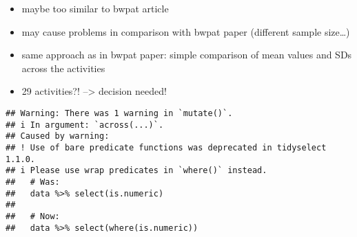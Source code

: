 \documentclass[
]{article}
\providecommand{\tightlist}{%
  \setlength{\itemsep}{0pt}\setlength{\parskip}{0pt}}
\begin{document}
\begin{itemize}
\tightlist
\item
  maybe too similar to bwpat article
\item
  may cause problems in comparison with bwpat paper (different sample
  size\ldots)
\item
  same approach as in bwpat paper: simple comparison of mean values and
  SDs across the activities
\item
  29 activities?! --\textgreater{} decision needed!
\end{itemize}

\begin{verbatim}
## Warning: There was 1 warning in `mutate()`.
## i In argument: `across(...)`.
## Caused by warning:
## ! Use of bare predicate functions was deprecated in tidyselect 1.1.0.
## i Please use wrap predicates in `where()` instead.
##   # Was:
##   data %>% select(is.numeric)
## 
##   # Now:
##   data %>% select(where(is.numeric))
\end{verbatim}

\begingroup\fontsize{9}{11}\selectfont
\end{document}
